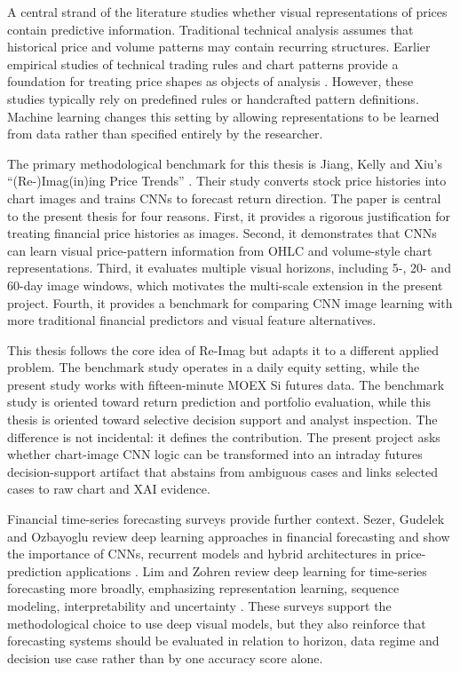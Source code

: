A central strand of the literature studies whether visual representations of prices contain predictive information. Traditional technical analysis assumes that historical price and volume patterns may contain recurring structures. Earlier empirical studies of technical trading rules and chart patterns provide a foundation for treating price shapes as objects of analysis \cite{brock_technical_trading,lo_foundations_technical_analysis}. However, these studies typically rely on predefined rules or handcrafted pattern definitions. Machine learning changes this setting by allowing representations to be learned from data rather than specified entirely by the researcher.

The primary methodological benchmark for this thesis is Jiang, Kelly and Xiu's ``(Re-)Imag(in)ing Price Trends'' \cite{jiang_reimagining_price_trends}. Their study converts stock price histories into chart images and trains CNNs to forecast return direction. The paper is central to the present thesis for four reasons. First, it provides a rigorous justification for treating financial price histories as images. Second, it demonstrates that CNNs can learn visual price-pattern information from OHLC and volume-style chart representations. Third, it evaluates multiple visual horizons, including 5-, 20- and 60-day image windows, which motivates the multi-scale extension in the present project. Fourth, it provides a benchmark for comparing CNN image learning with more traditional financial predictors and visual feature alternatives.

This thesis follows the core idea of Re-Imag but adapts it to a different applied problem. The benchmark study operates in a daily equity setting, while the present study works with fifteen-minute MOEX Si futures data. The benchmark study is oriented toward return prediction and portfolio evaluation, while this thesis is oriented toward selective decision support and analyst inspection. The difference is not incidental: it defines the contribution. The present project asks whether chart-image CNN logic can be transformed into an intraday futures decision-support artifact that abstains from ambiguous cases and links selected cases to raw chart and XAI evidence.

Financial time-series forecasting surveys provide further context. Sezer, Gudelek and Ozbayoglu review deep learning approaches in financial forecasting and show the importance of CNNs, recurrent models and hybrid architectures in price-prediction applications \cite{sezer_financial_forecasting_survey}. Lim and Zohren review deep learning for time-series forecasting more broadly, emphasizing representation learning, sequence modeling, interpretability and uncertainty \cite{lim_zohren_time_series_forecasting}. These surveys support the methodological choice to use deep visual models, but they also reinforce that forecasting systems should be evaluated in relation to horizon, data regime and decision use case rather than by one accuracy score alone.

